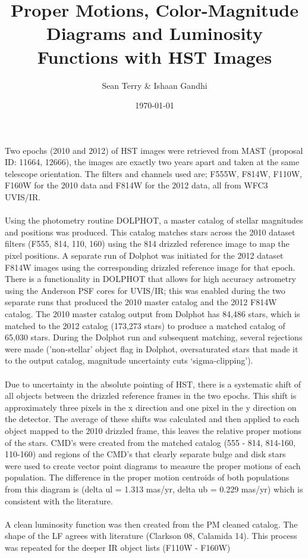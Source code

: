 \documentclass[12pt]{article}
\begin{document}
\date{\today}
\title{Proper Motions, Color-Magnitude Diagrams and Luminosity Functions with HST Images}
\author{Sean Terry \& Ishaan Gandhi} 
 
\maketitle

\section*{}
Two epochs (2010 and 2012) of HST images were retrieved from MAST (proposal ID: 11664, 12666), the images are exactly two years apart and taken at the same telescope orientation. The filters and channels used are; F555W, F814W, F110W, F160W for the 2010 data and F814W for the 2012 data, all from WFC3 UVIS/IR.
\\
\\
\indent Using the photometry routine DOLPHOT, a master catalog of stellar magnitudes and positions was produced. This catalog matches stars across the 2010 dataset filters (F555, 814, 110, 160) using the 814 drizzled reference image to map the pixel positions. A separate run of Dolphot was initiated for the 2012 dataset F814W images using the corresponding drizzled reference image for that epoch. There is a functionality in DOLPHOT that allows for high accuracy astrometry using the Anderson PSF cores for UVIS/IR; this was enabled during the two separate runs that produced the 2010 master catalog and the 2012 F814W catalog. The 2010 master catalog output from Dolphot has 84,486 stars, which is matched to the 2012 catalog (173,273 stars) to produce a matched catalog of 65,030 stars. During the Dolphot run and subsequent matching, several rejections were made ('non-stellar' object flag in Dolphot, oversaturated stars that made it to the output catalog, magnitude uncertainty cuts `sigma-clipping').
\\
\\
\indent Due to uncertainty in the absolute pointing of HST, there is a systematic shift of all objects between the drizzled reference frames in the two epochs. This shift is approximately three pixels in the x direction and one pixel in the y direction on the detector. The average of these shifts was calculated and then applied to each object mapped to the 2010 drizzled frame, this leaves the relative proper motions of the stars. CMD's were created from the matched catalog (555 - 814, 814-160, 110-160) and regions of the CMD's that clearly separate bulge and disk stars were used to create vector point diagrams to measure the proper motions of each population. The difference in the proper motion centroids of both populations from this diagram is (delta ul = 1.313 mas/yr, delta ub = 0.229 mas/yr) which is consistent with the literature.
\\
\\
\indent A clean luminosity function was then created from the PM cleaned catalog. The shape of the LF agrees with literature (Clarkson 08, Calamida 14). This process was repeated for the deeper IR object lists (F110W - F160W)



 
\end{document}
